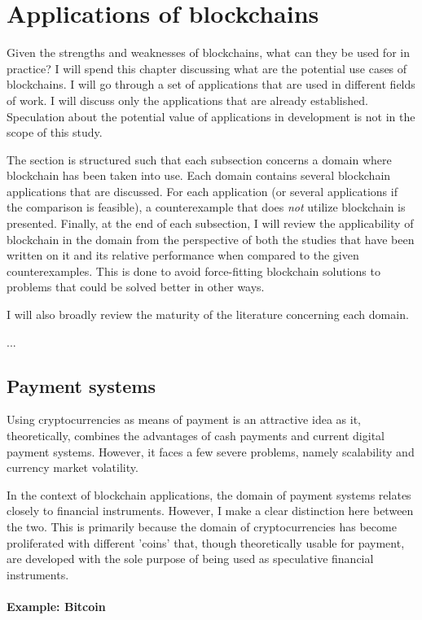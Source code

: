 \section{Applications of blockchains}

Given the strengths and weaknesses of blockchains, what can they be
used for in practice? I will spend this chapter discussing what are
the potential use cases of blockchains. I will go through a set of
applications that are used in different fields of work. I will discuss
only the applications that are already established. Speculation about
the potential value of applications in development is not in the scope
of this study. 

The section is structured such that each subsection concerns a domain
where blockchain has been taken into use. Each domain contains several
blockchain applications that are discussed. For each application (or
several applications if the comparison is feasible), a counterexample
that does \textit{not} utilize blockchain is presented.  
Finally, at the end of each subsection, I will review the
applicability of blockchain in the domain from the perspective of both
the studies that have been written on it and its relative performance
when compared to the given counterexamples. This is done to avoid
force-fitting blockchain solutions to problems that could be solved
better in other ways. 

I will also broadly review the maturity of the literature concerning
each domain.

...

\subsection{Payment systems}

Using cryptocurrencies as means of payment is an attractive idea as
it, theoretically, combines the advantages of cash payments and current
digital payment systems. However, it faces a few severe problems, namely
scalability and currency market volatility.

In the context of blockchain applications, the domain of payment
systems relates closely to financial instruments. However, I make a
clear distinction here between the two. This is primarily because the
domain of cryptocurrencies has become proliferated with different
'coins' that, though theoretically usable for payment, are developed
with the sole purpose of being used as speculative financial
instruments.

\paragraph{Example: Bitcoin}

